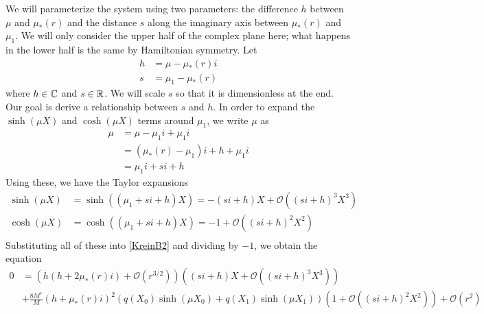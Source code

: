 \documentclass[thesis.tex]{subfiles}
\begin{document}
We will parameterize the system using two parameters: the difference $h$ between $\mu$ and $\mu_*(r)$ and the distance $s$ along the imaginary axis between $\mu_*(r)$ and $\mu_1$. We will only consider the upper half of the complex plane here; what happens in the lower half is the same by Hamiltonian symmetry. Let 
\begin{align*}
h &= \mu - \mu_*(r) i \\
s &= \mu_1 - \mu_*(r)
\end{align*}
where $h \in \mathbb{C}$ and $s \in \mathbb{R}$. We will scale $s$ so that it is dimensionless at the end. Our goal is derive a relationship between $s$ and $h$. In order to expand the $\sinh(\mu X)$ and $\cosh(\mu X)$ terms around $\mu_1$, we write $\mu$ as
\begin{align*}
\mu &= \mu - \mu_1 i + \mu_1 i \\
&= (\mu_*(r) - \mu_1)i + h + \mu_1 i \\
&= \mu_1 i + s i + h
\end{align*}
Using these, we have the Taylor expansions
\begin{align*}
\sinh(\mu X) &= \sinh((\mu_1 + s i + h)X)
= -(s i + h)X + \mathcal{O}\left( (s i +h)^3 X^3 \right) \\
\cosh(\mu X) &= \cosh((\mu_1 + s i + h)X)
= -1 + \mathcal{O}\left( (s i + h)^2 X^2 \right) \\
\end{align*}
Substituting all of these into \cref{KreinB2} and dividing by $-1$, we obtain the equation
\begin{equation}\label{KreinB3}
\begin{aligned}
0 &= \left( h ( h + 2 \mu_*(r) i) +  \mathcal{O}( r^{3/2} )\right) \left( (s i + h)X + \mathcal{O}\left( (si+h)^3 X^3 \right)  \right) \\
&+\frac{8 M^c}{M} ( h + \mu_*(r) i)^2 ( q(X_0)\sinh(\mu X_0) + q(X_1) \sinh(\mu X_1) ) \left( 1 + \mathcal{O}\left( (s i +h)^2 X^2 \right) \right) + \mathcal{O}( r^2 )
\end{aligned}
\end{equation}
\end{document}
